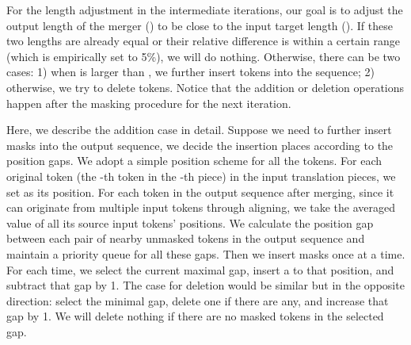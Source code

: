 \documentclass[11pt,a4paper]{article}
\begin{document}
For the length adjustment in the intermediate iterations, our goal is to adjust the output length of the merger () to be close to the input target length (). If these two lengths are already equal or their relative difference is within a certain range (which is empirically set to 5\%), we will do nothing. Otherwise, there can be two cases: 1) when  is larger than , we further insert   tokens into the sequence; 2) otherwise, we try to delete   tokens. Notice that the addition or deletion operations happen after the masking procedure for the next iteration.

Here, we describe the addition case in detail. Suppose we need to further insert  masks into the output sequence, we decide the insertion places according to the position gaps. 
We adopt a simple position scheme for all the tokens.
For each original token  (the -th token in the -th piece) in the input translation pieces, we set  as its position.
For each token in the output sequence after merging, since it can originate from multiple input tokens through aligning, we take the averaged value of all its source input tokens' positions.
We calculate the position gap between each pair of nearby unmasked tokens in the output sequence and maintain a priority queue for all these gaps. Then we insert  masks once at a time. For each time, we select the current maximal gap, insert a  to that position, and subtract that gap by 1.
The case for deletion would be similar but in the opposite direction: select the minimal gap, delete one  if there are any, and increase that gap by 1.
We will delete nothing if there are no masked tokens in the selected gap.
\end{document}
